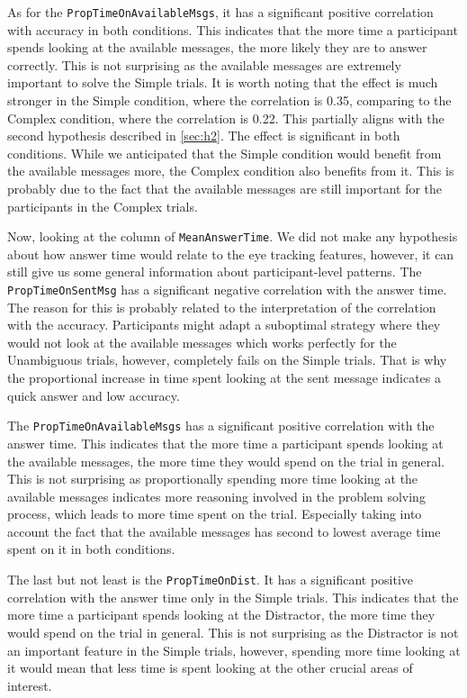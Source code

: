 As for the \texttt{PropTimeOnAvailableMsgs}, it has a significant positive correlation with accuracy in both conditions. This indicates that the more time a participant spends looking at the available messages, the more likely they are to answer correctly. This is not surprising as the available messages are extremely important to solve the Simple trials. It is worth noting that the effect is much stronger in the Simple condition, where the correlation is 0.35, comparing to the Complex condition, where the correlation is 0.22. This partially aligns with the second hypothesis described in \autoref{sec:h2}. The effect is significant in both conditions. While we anticipated that the Simple condition would benefit from the available messages more, the Complex condition also benefits from it. This is probably due to the fact that the available messages are still important for the participants in the Complex trials.

\sloppy
Now, looking at the column of \texttt{MeanAnswerTime}. We did not make any hypothesis about how answer time would relate to the eye tracking features, however, it can still give us some general information about participant-level patterns. The \texttt{PropTimeOnSentMsg} has a significant negative correlation with the answer time. The reason for this is probably related to the interpretation of the correlation with the accuracy. Participants might adapt a suboptimal strategy where they would not look at the available messages which works perfectly for the Unambiguous trials, however, completely fails on the Simple trials. That is why the proportional increase in time spent looking at the sent message indicates a quick answer and low accuracy. 
\sloppy

The \texttt{PropTimeOnAvailableMsgs} has a significant positive correlation with the answer time. This indicates that the more time a participant spends looking at the available messages, the more time they would spend on the trial in general. This is not surprising as proportionally spending more time looking at the available messages indicates more reasoning involved in the problem solving process, which leads to more time spent on the trial. Especially taking into account the fact that the available messages has second to lowest average time spent on it in both conditions. 

The last but not least is the \texttt{PropTimeOnDist}. It has a significant positive correlation with the answer time only in the Simple trials. This indicates that the more time a participant spends looking at the Distractor, the more time they would spend on the trial in general. This is not surprising as the Distractor is not an important feature in the Simple trials, however, spending more time looking at it would mean that less time is spent looking at the other crucial areas of interest.

